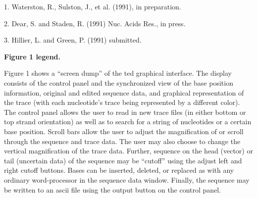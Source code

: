 1. Waterston, R., Sulston, J., et al. (1991), in preparation.

2. Dear, S. and Staden, R. (1991) Nuc. Acids Res.,  in press.

3. Hillier, L. and Green, P. (1991) submitted.


{\bf Figure 1 legend.}

Figure 1 shows a ``screen dump'' of the ted graphical interface.  
The display consists of
the control panel and the synchronized view of the base position
information, original and edited sequence data, 
and graphical representation of the trace (with each nucleotide's trace
 being represented
by a different color).  The control
panel allows the user to read in new trace files (in either
bottom or top strand orientation)
as well as to search for a string of nucleotides or a certain base position.
Scroll bars allow the user to adjust the magnification of or scroll through
the sequence and trace data.  The user may also choose to change the vertical
magnification of the trace data.  Further, sequence on the head (vector)
or tail (uncertain data) of the sequence may be ``cutoff'' 
using the adjust left and right cutoff buttons. Bases can be inserted, 
deleted, or replaced as with
any ordinary word-processor in the sequence data window. Finally, the
sequence may be written to an ascii file using the output button on
the control panel.





